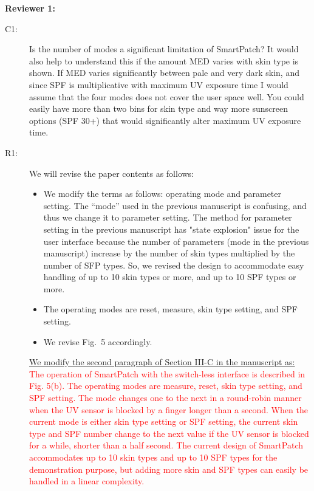 \documentclass[onecolumn]{IEEEconf}
\begin{document}
\textbf{Reviewer 1:}
\begin{description}
\item [C1: ] Is the number of modes a significant limitation of SmartPatch? It would also help to understand this if the amount MED varies with skin type is shown. If MED varies significantly between pale and very dark skin, and since SPF is multiplicative with maximum UV exposure time I would assume that the four modes does not cover the user space well. You could easily have more than two bins for skin type and way more sunscreen options (SPF 30+) that would significantly alter maximum UV exposure time.  
\item [R1: ] We will revise the paper contents as follows:
\begin{itemize}
\item We modify the terms as follows: operating mode and parameter setting.  The ``mode'' used in the previous manuscript is confusing, and thus we change it to parameter setting. The method for parameter setting in the previous manuscript has "state explosion" issue for the user interface because the number of parameters (mode in the previous manuscript) increase by the number of skin types multiplied by the number of SFP types. So, we revised the design to accommodate easy handling of up to 10 skin types or more, and up to 10 SPF types or more.
\item The operating modes are reset, measure, skin type setting, and SPF setting.
\item We revise Fig.~5 accordingly.
\end{itemize}

\underline{We modify the second paragraph of Section III-C in the manuscript as:}\\
\textcolor{red}{The operation of SmartPatch with the switch-less interface is described in Fig. 5(b). The operating modes are measure, reset, skin type setting, and SPF setting. The mode changes one to the next in a round-robin manner when the UV sensor is blocked by a finger longer than a second. When the current mode is either skin type setting or SPF setting, the current skin type and SPF number change to the next value if the UV sensor is blocked for a while, shorter than a half second. The current design of SmartPatch accommodates up to 10 skin types and up to 10 SPF types for the demonstration purpose, but adding more skin and SPF types can easily be handled in a linear complexity.}


\end{description}
\end{document}
